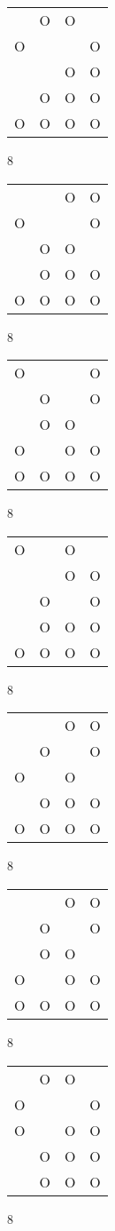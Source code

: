 \begin{tabular}{|m{0.2cm}m{0.2cm}m{0.2cm}m{0.2cm}|}\hline
 &O&O& \\
O& & &O\\
 & &O&O\\
 &O&O&O\\
O&O&O&O\\
\hline\end{tabular}8
\begin{tabular}{|m{0.2cm}m{0.2cm}m{0.2cm}m{0.2cm}|}\hline
 & &O&O\\
O& & &O\\
 &O&O& \\
 &O&O&O\\
O&O&O&O\\
\hline\end{tabular}8
\begin{tabular}{|m{0.2cm}m{0.2cm}m{0.2cm}m{0.2cm}|}\hline
O& & &O\\
 &O& &O\\
 &O&O& \\
O& &O&O\\
O&O&O&O\\
\hline\end{tabular}8
\begin{tabular}{|m{0.2cm}m{0.2cm}m{0.2cm}m{0.2cm}|}\hline
O& &O& \\
 & &O&O\\
 &O& &O\\
 &O&O&O\\
O&O&O&O\\
\hline\end{tabular}8
\begin{tabular}{|m{0.2cm}m{0.2cm}m{0.2cm}m{0.2cm}|}\hline
 & &O&O\\
 &O& &O\\
O& &O& \\
 &O&O&O\\
O&O&O&O\\
\hline\end{tabular}8
\begin{tabular}{|m{0.2cm}m{0.2cm}m{0.2cm}m{0.2cm}|}\hline
 & &O&O\\
 &O& &O\\
 &O&O& \\
O& &O&O\\
O&O&O&O\\
\hline\end{tabular}8
\begin{tabular}{|m{0.2cm}m{0.2cm}m{0.2cm}m{0.2cm}|}\hline
 &O&O& \\
O& & &O\\
O& &O&O\\
 &O&O&O\\
 &O&O&O\\
\hline\end{tabular}8
